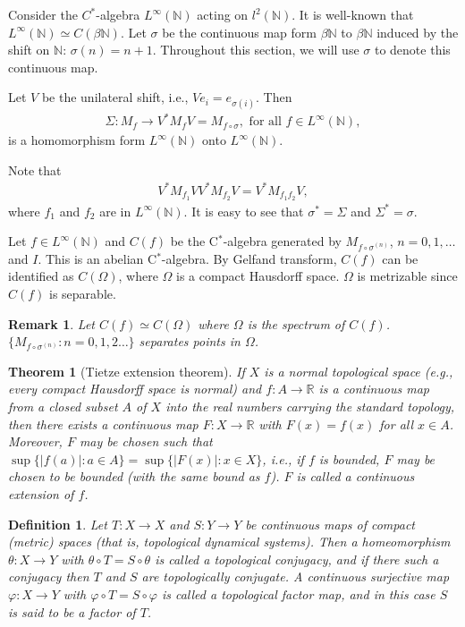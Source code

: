 \documentclass[a4paper,10pt]{amsart}
\newtheorem{theorem}{Theorem}[section]
\newtheorem{definition}{Definition}[section]
\newtheorem{remark}{Remark}[section]
\newcommand{\R}{\mathbb R}  %
\newcommand{\N}{\mathbb N} %
\begin{document}
Consider the $C^{*}$-algebra $L^{\infty}(\N)$ acting on $l^{2}(\N)$.
It is well-known that  $L^{\infty}(\N) \simeq C(\beta \N)$.
Let $\sigma$ be the continuous map form $\beta \N$ to $\beta \N$
induced by the shift on $\N$: $\sigma(n) = n+1$.
Throughout this section, we will use $\sigma$ to denote this
continuous map.

Let $V$ be the unilateral shift, i.e., $V e_{i} = e_{\sigma(i)}$.
Then
\begin{align*}
    \Sigma: M_{f} \rightarrow V^{*}M_{f}V = M_{f \circ \sigma}, 
    \mbox{ for all } f 
    \in L^{\infty}(\N),
\end{align*}
is a homomorphism form $L^{\infty}(\N)$ onto $L^{\infty}(\N)$.

Note that 
\begin{align*}
    V^{*}M_{f_1}VV^{*}M_{f_2}V = V^{*}M_{f_{1}f_{2}}V,
\end{align*}
where $f_1$ and $f_2$ are in $L^{\infty}(\N)$.
It is easy to see that $\sigma^{*} = \Sigma$ and $\Sigma^{*} = \sigma$.

Let $f \in L^{\infty}(\N)$ and $C(f)$ be the C$^*$-algebra generated
by $M_{f \circ \sigma^{(n)}}$, $n = 0, 1, \ldots$ 
and $I$. This is an abelian 
C$^*$-algebra. By Gelfand transform, $C(f)$ can be identified as
$C(\Omega)$, where $\Omega$ is a compact Hausdorff 
space. $\Omega$ is metrizable since $C(f)$ is separable.

\begin{remark}
    Let $C(f) \simeq C(\Omega)$ where $\Omega$ is the spectrum of $C(f)$.
    $\{M_{f \circ \sigma^{(n)}} : n = 0, 1, 2 \ldots \}$ 
    separates points in $\Omega$.
\end{remark}

\begin{theorem}[Tietze extension theorem]
    If $X$ is a normal topological space (e.g., every compact Hausdorff 
    space is normal) and $f: A \rightarrow \R$ is a continuous map 
    from a closed subset $A$ of $X$ into the real numbers 
    carrying the standard topology, then there exists a continuous map
    $F: X \to \R$ with $F(x) = f(x)$ for all $x \in A$.
    Moreover, $F$ may be chosen such that 
    $\sup \{ |f(a)| : a \in A \} = \sup \{ |F(x)| : x \in X \}$, i.e., 
    if $f$ is bounded, $F$ may be chosen to be bounded 
    (with the same bound as $f$). $F$ is called a continuous 
    extension of $f$.
\end{theorem}

\begin{definition}
Let $T: X \rightarrow X$ and $S:Y \rightarrow Y$ be continuous maps
of compact (metric) spaces (that is, topological dynamical systems). 
Then a homeomorphism $\theta : X \rightarrow Y$ with 
$\theta \circ T = S \circ \theta$ is called a topological conjugacy,
and if there such a conjugacy then $T$ and $S$ are topologically conjugate. 
A continuous surjective map $\varphi : X \rightarrow Y$ with 
$\varphi \circ T = S \circ \varphi$ is called a topological
factor map, and in this case $S$ is said to be a factor of $T$.
\end{definition}
\end{document}
